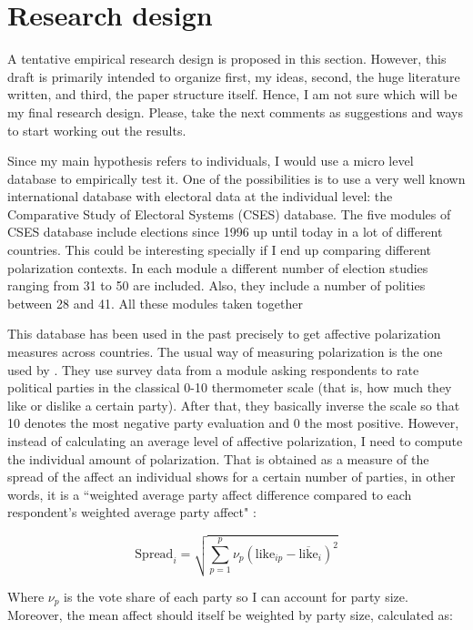 \documentclass[a4paper, svgnames]{article}
\begin{document}
\section{Research design}

A tentative empirical research design is proposed in this section. However, this draft is primarily intended to organize first, my ideas, second, the huge literature written, and third, the paper structure itself. Hence, I am not sure which will be my final research design. Please, take the next comments as suggestions and ways to start working out the results.

Since my main hypothesis refers to individuals, I would use a micro level database to empirically test it. One of the possibilities is to use a very well known international database with electoral data at the individual level: the Comparative Study of Electoral Systems (CSES) database. The five modules of CSES database include elections since 1996 up until today in a lot of different countries. This could be interesting specially if I end up comparing different polarization contexts. In each module a different number of election studies ranging from 31 to 50 are included. Also, they include a number of polities between 28 and 41. All these modules taken together 

This database has been used in the past precisely to get affective polarization measures across countries. The usual way of measuring polarization is the one used by \cite{Gidron2018}. They use survey data from a module asking respondents to rate political parties in the classical 0-10 thermometer scale (that is, how much they like or dislike a certain party). After that, they basically inverse the scale so that 10 denotes the most negative party evaluation and 0 the most positive. However, instead of calculating an average level of affective polarization, I need to compute the individual amount of polarization. That is obtained as a measure of the spread of the affect an individual shows for a certain number of parties, in other words, it is a ``weighted average party affect difference compared to each respondent's weighted average party affect" \citep{Wagner2021}:

$$
\text{Spread}_i = \sqrt{\sum^p_{p=1}\nu_p(\text{like}_{ip}-\overline{\text{like}}_i)^2}
$$

Where $\nu_p$ is the vote share of each party so I can account for party size. Moreover, the mean affect should itself be weighted by party size, calculated as:
\end{document}
